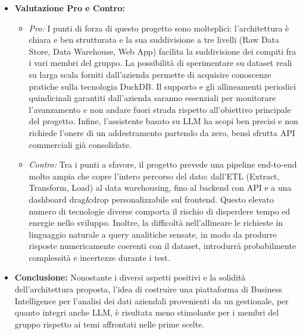 \documentclass[12pt,a4paper]{article}
\newcommand{\tightlist}{\setlength{\itemsep}{1pt}\setlength{\parskip}{0pt}}
\begin{document}
\begin{itemize}
\item \textbf{Valutazione Pro e Contro:}
  \begin{itemize}
  \tightlist
  \item \emph{Pro:} I punti di forza di questo progetto sono molteplici: l’architettura è chiara e ben strutturata e la sua suddivisione a tre livelli (Raw Data Store, Data Warehouse, Web App) facilita la suddivisione dei compiti fra i vari membri del gruppo. La possibilità di sperimentare su dataset reali su larga scala forniti dall’azienda permette di acquisire conoscenze pratiche sulla tecnologia DuckDB. Il supporto e gli allineamenti periodici quindicinali garantiti dall’azienda saranno essenziali per monitorare l'avanzamento e non andare fuori strada rispetto all’obiettivo principale del progetto. Infine, l’assistente basato su LLM ha scopi ben precisi e non richiede l'onere di un addestramento partendo da zero, bensì sfrutta API commerciali già consolidate.  
  \item \emph{Contro:} Tra i punti a sfavore, il progetto prevede una pipeline end-to-end molto ampia che copre l'intero percorso del dato: dall'ETL (Extract, Transform, Load) al data warehousing, fino al backend con API e a una dashboard drag\&drop personalizzabile sul frontend. Questo elevato numero di tecnologie diverse comporta il rischio di disperdere tempo ed energie nello sviluppo. Inoltre, la difficoltà nell’allineare le richieste in linguaggio naturale a query analitiche sensate, in modo da produrre risposte numericamente coerenti con il dataset, introdurrà probabilmente complessità e incertezze durante i test.  
  \end{itemize}
\item \textbf{Conclusione:} Nonostante i diversi aspetti positivi e la solidità dell'architettura proposta, l’idea di costruire una piattaforma di Business Intelligence per l'analisi dei dati aziendali provenienti da un gestionale, per quanto integri anche LLM, è risultata meno stimolante per i membri del gruppo rispetto ai temi affrontati nelle prime scelte.

\end{itemize}
\end{document}
